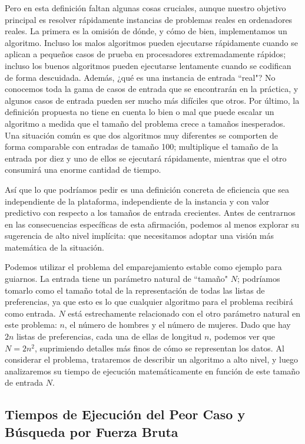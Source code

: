 \documentclass[a4paper, 12pt]{book}
\theoremstyle{dotless}
\begin{document}
Pero en esta definición faltan algunas cosas cruciales, aunque nuestro
objetivo principal es resolver rápidamente instancias de problemas reales en ordenadores reales. La primera es la omisión de dónde, y cómo de bien, implementamos un algoritmo. Incluso los malos algoritmos pueden ejecutarse rápidamente cuando se aplican a pequeños casos de prueba en procesadores extremadamente rápidos; incluso los buenos algoritmos pueden ejecutarse lentamente cuando se codifican de forma descuidada.
Además, ¿qué es una instancia de entrada ``real"?
No conocemos toda la gama de casos de entrada que se encontrarán en la práctica, y algunos casos de entrada pueden ser mucho más difíciles que otros. 
Por último, la definición propuesta no tiene en cuenta lo bien o mal que puede escalar un algoritmo a medida que el tamaño del problema crece
a tamaños inesperados. Una situación común es que dos algoritmos muy diferentes se comporten de forma comparable con entradas de tamaño 100; multiplique el tamaño de la entrada por diez y uno de ellos se ejecutará rápidamente, mientras que el otro consumirá una enorme cantidad de tiempo.

Así que lo que podríamos pedir es una definición concreta de eficiencia que sea independiente de la plataforma, independiente de la instancia y con valor predictivo con respecto a los tamaños de entrada crecientes. Antes de centrarnos en las consecuencias específicas de esta afirmación, podemos al menos explorar su sugerencia de alto nivel implícita: que necesitamos adoptar una visión más matemática de la situación.

Podemos utilizar el problema del emparejamiento estable como ejemplo para guiarnos. La entrada tiene un parámetro natural de ``tamaño" $N$; podríamos tomarlo como el tamaño total de la representación de todas las listas de preferencias, ya que esto es lo que cualquier algoritmo para el problema recibirá como entrada. $N$ está estrechamente relacionado con el otro parámetro natural en este problema: $n$, el número de hombres y el número de mujeres. Dado que hay $2n$ listas de preferencias, cada una de ellas de longitud $n$, podemos ver que $N = 2n^2$, suprimiendo detalles más finos de cómo se representan los datos. Al considerar el problema, trataremos de describir un algoritmo a alto nivel, y luego analizaremos su tiempo de ejecución matemáticamente en función de este tamaño de entrada $N$.


\subsection*{Tiempos de Ejecución del Peor Caso y Búsqueda por Fuerza Bruta} 
\end{document}
